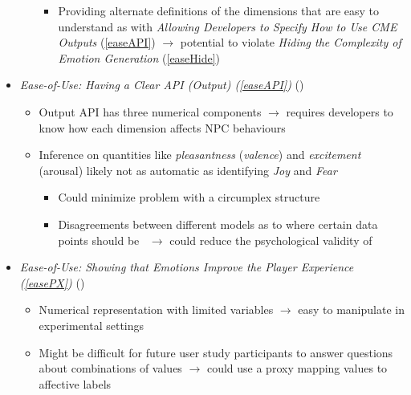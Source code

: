 \begin{itemize}
\begin{itemize}
\begin{itemize}
            \item Providing alternate definitions of the dimensions that are
            easy to understand as with \textit{Allowing Developers to Specify
                How to Use CME Outputs} (\ref{easeAPI}) $\rightarrow$ potential
                to
            violate \textit{Hiding the Complexity of Emotion Generation}
            (\ref{easeHide})
        \end{itemize}
    \end{itemize}

    \item \textit{Ease-of-Use: Having a Clear API (Output) (\ref{easeAPI})}
    (\weak)
    \begin{itemize}
        \item Output API has three numerical components $\rightarrow$ requires
        developers to know how each dimension affects NPC behaviours

        \item Inference on quantities like \textit{pleasantness}
        (\textit{valence}) and \textit{excitement} (arousal) likely not as
        automatic as identifying \textit{Joy} and \textit{Fear}
        \begin{itemize}
            \item Could minimize problem with a circumplex structure

            \item Disagreements between different models as to where certain
            data points should be~\citep[p.~287]{remington2000reexamining}
            $\rightarrow$ could reduce the psychological validity of \progname{}
        \end{itemize}
    \end{itemize}

    \item \textit{Ease-of-Use: Showing that Emotions Improve the Player
        Experience (\ref{easePX})} (\good)
    \begin{itemize}
        \item Numerical representation with limited variables $\rightarrow$
        easy to manipulate in  experimental settings

        \item Might be difficult for future user study participants to answer
        questions about combinations of values $\rightarrow$ could use a proxy
        mapping values to affective labels
    \end{itemize}


\end{itemize}
